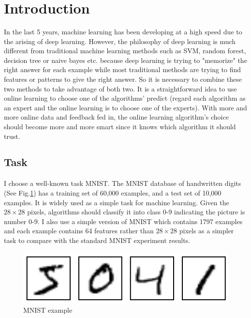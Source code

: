 \documentclass{gapd}
\begin{document}
\maketitle


\section{Introduction}
\label{sec:Introduction}
\paragraph{}
	\lettrine{I}{}n the last 5 years, machine learning has been developing at a high speed due to the arising of deep learning. However, the philosophy of deep learning is much different from traditional machine learning methods such as SVM, random forest, decision tree or naive bayes etc. because deep learning is trying to "memorize" the right answer for each example\cite{zhang2016understanding} while most traditional methods are trying to find features or patterns to give the right answer. So it is necessary to combine these two methods to take advantage of both two. It is a straightforward idea to use online learning to choose one of the algorithms' predict (regard each algorithm as an expert and the online learning is to choose one of the experts). With more and more online data and feedback fed in, the online learning algorithm's choice should become more and more smart since it knows which algorithm it should trust. 

\subsection{Task}
\paragraph{}
	I choose a well-known task MNIST. The MNIST database of handwritten digits (See Fig.\ref{fig:MNIST}) has a training set of 60,000 examples, and a test set of 10,000 examples. It is widely used as a simple task for machine learning. Given the $28 \times 28$ pixels, algorithms should classify it into class 0-9 indicating the picture is number 0-9. I also use a simple version of MNIST which contains 1797 examples and each example contains 64 features rather than $28 \times 28$ pixels as a simpler task to compare with the standard MNIST experiment results. 

\begin{figure}[htb]
	\centering
	\includegraphics[width=\linewidth / 2]{graph/MNIST}
	\caption{MNIST example}
	\label{fig:MNIST}
\end{figure}
\end{document}
